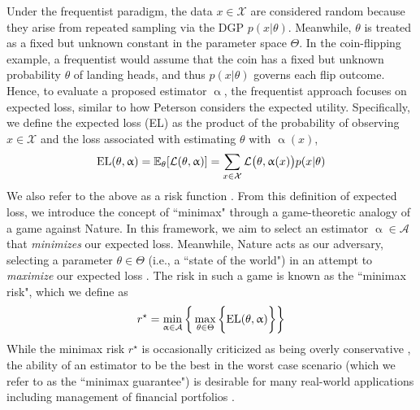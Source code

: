 \documentclass[letterpaper,12pt]{article}
\newcommand{\given}{|}
\begin{document}
Under the frequentist paradigm, the data $x \in \mathcal{X}$ are considered random because they arise from repeated sampling via the DGP $p(x \given \theta)$. Meanwhile, $\theta$ is treated as a fixed but unknown constant in the parameter space $\Theta$. In the coin-flipping example, a frequentist would assume that the coin has a fixed but unknown probability $\theta$ of landing heads, and thus $p(x\given \theta)$ governs each flip outcome. Hence, to evaluate a proposed estimator $\upalpha$, the frequentist approach focuses on expected loss, similar to how Peterson \cite{peterson2017} considers the expected utility. Specifically, we define the expected loss (EL) as the product of the probability of observing $x \in \mathcal{X}$ and the loss associated with estimating $\theta$ with $\upalpha(x)$,\vspace{-0.5cm}
\begin{equation}
	\text{EL}(\theta, \upalpha) = \mathbb{E}_{\theta}[\mathcal{L}(\theta, \upalpha)] = \sum_{x \in \mathcal{X}} \mathcal{L}\big( \theta, \upalpha(x) \big) p(x \given \theta)  \label{eq:EL} \vspace{-0.35cm}
\end{equation}
We also refer to the above as a risk function \cite{nikulin2001}. From this definition of expected loss, we introduce the concept of ``minimax" through a game-theoretic analogy of a game against Nature. In this framework, we aim to select an estimator $\upalpha \in \mathcal{A}$ that \textit{minimizes} our expected loss. Meanwhile, Nature acts as our adversary, selecting a parameter $\theta \in \Theta$ (i.e., a ``state of the world") in an attempt to \textit{maximize} our expected loss \cite{ulansky2021}. The risk in such a game is known as the ``minimax risk", which we define as \vspace{-0.35cm}
\begin{equation}
	r^{\star} = \min_{\upalpha \in \mathcal{A}}\bigg\{ \max_{\theta \in \Theta} \bigg\{ \text{EL}(\theta, \upalpha) \bigg\} \bigg\} \label{eq:minimaxrisk} \vspace{-0.25cm}
\end{equation}
 While the minimax risk $r^{\star}$ is occasionally criticized as being overly conservative \cite{peterson2017}, the ability of an estimator to be the best in the worst case scenario (which we refer to as the ``minimax guarantee") is desirable for many real-world applications including management of financial portfolios \cite{DENG2005278}.\\
\end{document}
